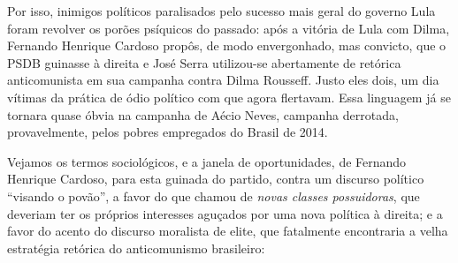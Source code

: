 Por isso, inimigos políticos paralisados pelo sucesso mais geral do
governo Lula foram revolver os porões psíquicos do passado: após a
vitória de Lula com Dilma, Fernando Henrique Cardoso propôs, de modo
envergonhado, mas convicto, que o PSDB guinasse à direita e José Serra
utilizou-se abertamente de retórica anticomunista em sua campanha contra
Dilma Rousseff. Justo eles dois, um dia vítimas da prática de ódio
político com que agora flertavam. Essa linguagem já se tornara quase
óbvia na campanha de Aécio Neves, campanha derrotada, provavelmente,
pelos pobres empregados do Brasil de 2014.

Vejamos os termos sociológicos, e a janela de oportunidades, de Fernando
Henrique Cardoso, para esta guinada do partido, contra um discurso
político ``visando o povão'', a favor do que chamou de \emph{novas
classes possuidoras}, que deveriam ter os próprios interesses aguçados
por uma nova política à direita; e a favor do acento do discurso
moralista de elite, que fatalmente encontraria a velha estratégia
retórica do anticomunismo brasileiro:

